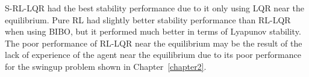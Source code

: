 S-RL-LQR had the best stability performance due to it only using LQR near the equilibrium. Pure RL had slightly better stability performance than RL-LQR when using BIBO, but it performed much better in terms of Lyapunov stability. The poor performance of RL-LQR near the equilibrium may be the result of the lack of experience of the agent near the equilibrium due to its poor performance for the swingup problem shown in Chapter~\ref{chapter2}.




